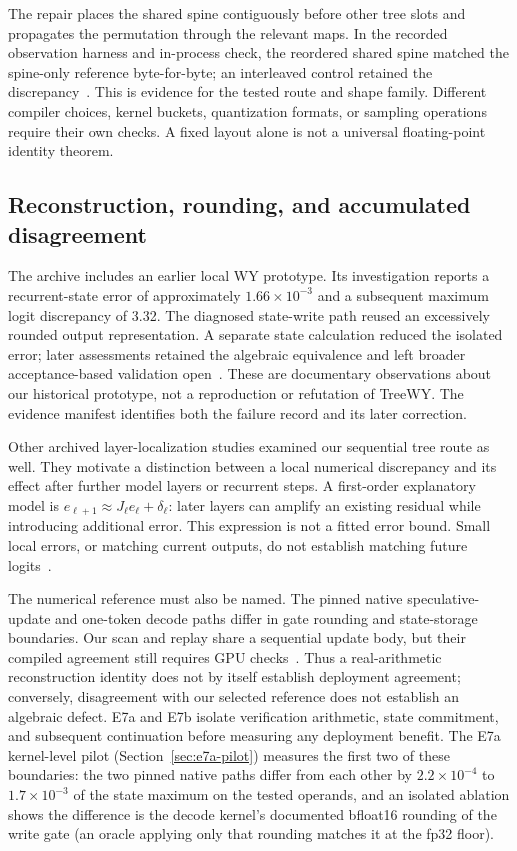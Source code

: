 \documentclass[conference]{IEEEtran}
\begin{document}
The repair places the shared spine contiguously before other tree slots and propagates the permutation through the relevant maps. In the recorded observation harness and in-process check, the reordered shared spine matched the spine-only reference byte-for-byte; an interleaved control retained the discrepancy~\cite{lumo2026spine}. This is evidence for the tested route and shape family. Different compiler choices, kernel buckets, quantization formats, or sampling operations require their own checks. A fixed layout alone is not a universal floating-point identity theorem.

\subsection{Reconstruction, rounding, and accumulated disagreement}
\label{sec:reconstruction-numerics}
The archive includes an earlier local WY prototype. Its investigation reports a recurrent-state error of approximately $1.66\times10^{-3}$ and a subsequent maximum logit discrepancy of 3.32. The diagnosed state-write path reused an excessively rounded output representation. A separate state calculation reduced the isolated error; later assessments retained the algebraic equivalence and left broader acceptance-based validation open~\cite{lumo2026archive}. These are documentary observations about our historical prototype, not a reproduction or refutation of TreeWY. The evidence manifest identifies both the failure record and its later correction.

Other archived layer-localization studies examined our sequential tree route as well. They motivate a distinction between a local numerical discrepancy and its effect after further model layers or recurrent steps. A first-order explanatory model is $e_{\ell+1}\approx J_\ell e_\ell+\delta_\ell$: later layers can amplify an existing residual while introducing additional error. This expression is not a fitted error bound. Small local errors, or matching current outputs, do not establish matching future logits~\cite{lumo2026archive}.

The numerical reference must also be named. The pinned native speculative-update and one-token decode paths differ in gate rounding and state-storage boundaries. Our scan and replay share a sequential update body, but their compiled agreement still requires GPU checks~\cite{lumo2026archive}. Thus a real-arithmetic reconstruction identity does not by itself establish deployment agreement; conversely, disagreement with our selected reference does not establish an algebraic defect. E7a and E7b isolate verification arithmetic, state commitment, and subsequent continuation before measuring any deployment benefit. The E7a kernel-level pilot (Section~\ref{sec:e7a-pilot}) measures the first two of these boundaries: the two pinned native paths differ from each other by $2.2\times10^{-4}$ to $1.7\times10^{-3}$ of the state maximum on the tested operands, and an isolated ablation shows the difference is the decode kernel's documented bfloat16 rounding of the write gate (an oracle applying only that rounding matches it at the fp32 floor).
\end{document}
